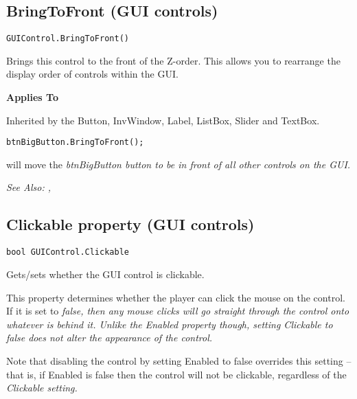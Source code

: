 \subsection{BringToFront (GUI controls)}\label{GUIControl.BringToFront}%

\begin{verbatim}
GUIControl.BringToFront()
\end{verbatim}
Brings this control to the front of the Z-order. This allows you to rearrange the display order
of controls within the GUI.

\bf{Applies To}

Inherited by the Button, InvWindow, Label, ListBox, Slider and TextBox.

\begin{verbatim}
btnBigButton.BringToFront();
\end{verbatim}
will move the \it{btnBigButton} button to be in front of all other controls on the GUI.

\it{See Also:}
,


\subsection{Clickable property (GUI controls)}\label{GUIControl.Clickable}%

\begin{verbatim}
bool GUIControl.Clickable
\end{verbatim}
Gets/sets whether the GUI control is clickable.

This property determines whether the player can click the mouse on the control. If it is set to \it{false},
then any mouse clicks will go straight through the control onto whatever is behind it. Unlike the Enabled
property though, setting Clickable to false does not alter the appearance of the control.

Note that disabling the control by setting Enabled to false overrides this setting -- that is, if Enabled
is false then the control will not be clickable, regardless of the \it{Clickable} setting.

